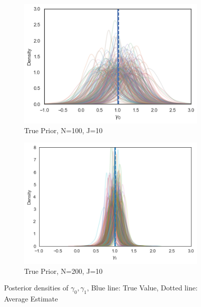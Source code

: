 \begin{figure}[h!]
  \centering
  \begin{subfigure}[b]{0.4\linewidth}
    \includegraphics[width=\linewidth]{graphics/posterior_plot_gamma0}
    \caption{True Prior, N=100, J=10}
  \end{subfigure}
  \begin{subfigure}[b]{0.4\linewidth}
    \includegraphics[width=\linewidth]{graphics/posterior_plot_gamma1}
    \caption{True Prior, N=200, J=10}
  \end{subfigure}
  \caption{Posterior densities  of $\gamma_0, \gamma_1$, Blue line: True Value, Dotted line: Average Estimate}
  \label{fig: gamma0 and gamma1}
\end{figure}

